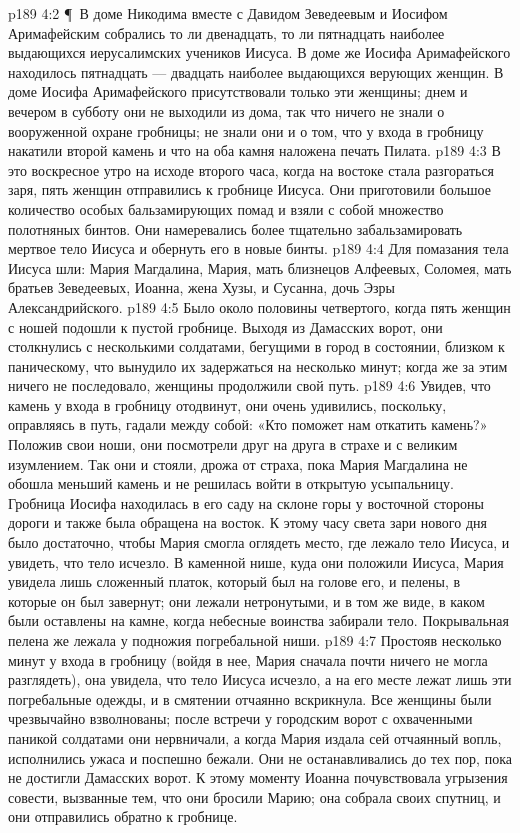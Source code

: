 \vs p189 4:2 \P\ В доме Никодима вместе с Давидом Зеведеевым и Иосифом Аримафейским собрались то ли двенадцать, то ли пятнадцать наиболее выдающихся иерусалимских учеников Иисуса. В доме же Иосифа Аримафейского находилось пятнадцать --- двадцать наиболее выдающихся верующих женщин. В доме Иосифа Аримафейского присутствовали только эти женщины; днем и вечером в субботу они не выходили из дома, так что ничего не знали о вооруженной охране гробницы; не знали они и о том, что у входа в гробницу накатили второй камень и что на оба камня наложена печать Пилата.
\vs p189 4:3 В это воскресное утро на исходе второго часа, когда на востоке стала разгораться заря, пять женщин отправились к гробнице Иисуса. Они приготовили большое количество особых бальзамирующих помад и взяли с собой множество полотняных бинтов. Они намеревались более тщательно забальзамировать мертвое тело Иисуса и обернуть его в новые бинты.
\vs p189 4:4 Для помазания тела Иисуса шли: Мария Магдалина, Мария, мать близнецов Алфеевых, Соломея, мать братьев Зеведеевых, Иоанна, жена Хузы, и Сусанна, дочь Эзры Александрийского.
\vs p189 4:5 Было около половины четвертого, когда пять женщин с ношей подошли к пустой гробнице. Выходя из Дамасских ворот, они столкнулись с несколькими солдатами, бегущими в город в состоянии, близком к паническому, что вынудило их задержаться на несколько минут; когда же за этим ничего не последовало, женщины продолжили свой путь.
\vs p189 4:6 Увидев, что камень у входа в гробницу отодвинут, они очень удивились, поскольку, оправляясь в путь, гадали между собой: «Кто поможет нам откатить камень?» Положив свои ноши, они посмотрели друг на друга в страхе и с великим изумлением. Так они и стояли, дрожа от страха, пока Мария Магдалина не обошла меньший камень и не решилась войти в открытую усыпальницу. Гробница Иосифа находилась в его саду на склоне горы у восточной стороны дороги и также была обращена на восток. К этому часу света зари нового дня было достаточно, чтобы Мария смогла оглядеть место, где лежало тело Иисуса, и увидеть, что тело исчезло. В каменной нише, куда они положили Иисуса, Мария увидела лишь сложенный платок, который был на голове его, и пелены, в которые он был завернут; они лежали нетронутыми, и в том же виде, в каком были оставлены на камне, когда небесные воинства забирали тело. Покрывальная пелена же лежала у подножия погребальной ниши.
\vs p189 4:7 Простояв несколько минут у входа в гробницу (войдя в нее, Мария сначала почти ничего не могла разглядеть), она увидела, что тело Иисуса исчезло, а на его месте лежат лишь эти погребальные одежды, и в смятении отчаянно вскрикнула. Все женщины были чрезвычайно взволнованы; после встречи у городским ворот с охваченными паникой солдатами они нервничали, а когда Мария издала сей отчаянный вопль, исполнились ужаса и поспешно бежали. Они не останавливались до тех пор, пока не достигли Дамасских ворот. К этому моменту Иоанна почувствовала угрызения совести, вызванные тем, что они бросили Марию; она собрала своих спутниц, и они отправились обратно к гробнице.
